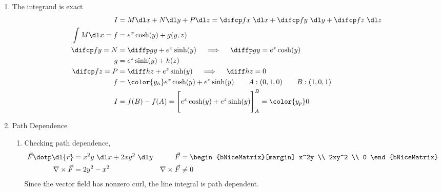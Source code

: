 \begin{enumerate}
    \item The integrand is exact
          \begin{align}
              I                & = M \dl x + N \dl y + P \dl z =
              \difcp fx\ \dl x + \difcp fy\ \dl y
              + \difcp fz\ \dl z                                                    \\
              \int M \dl x = f & = e^x \cosh(y) + g(y, z)                           \\
              \difcp fy = N    & = \diffp gy + e^x \sinh(y)
              \quad \implies \quad  \diffp gy = e^z \cosh(y)                        \\
              g                & = e^z\sinh(y) + h(z)                               \\
              \difcp fz = P    & = \diff hz + e^z \sinh(y)
              \quad \implies \quad \diff hz = 0                                     \\
              f                & = {\color{y_h} e^x \cosh(y) + e^z \sinh(y)}
              \qquad A : (0, 1, 0) \qquad B: (1, 0, 1)                              \\
              I                & = f(B) - f(A) = \Bigg[ e^x \cosh(y) + e^z \sinh(y)
                  \Bigg]_A^B = \color{y_p} 0
          \end{align}

    \item Path Dependence
          \begin{enumerate}
              \item Checking path dependence,
                    \begin{align}
                        \vec{F} \dotp \dl{\vec{r}} & = x^2 y\ \dl x + 2xy^2\ \dl y &
                        \vec{F}                    & =
                        \begin{bNiceMatrix}[margin]
                            x^2y \\ 2xy^2 \\ 0
                        \end{bNiceMatrix}                                   \\
                        \nabla \times \vec{F}      & = 2y^2 - x^2                  &
                        \nabla \times \vec{F}      & \neq 0
                    \end{align}
                    Since the vector field has nonzero curl, the line integral is path
                    dependent.


\end{enumerate}
\end{enumerate}
